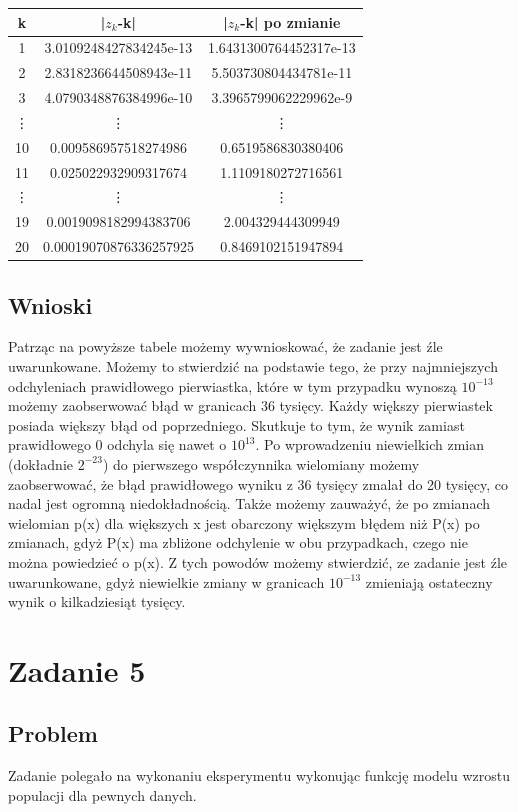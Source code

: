 \documentclass[11pt, a4paper]{article}
\begin{document}
\begin{center}
  \begin{tabular}{c|c|c}
    k & |$z_{k}$-k| & |$z_{k}$-k| po zmianie\\
    \hline
    1 & 3.0109248427834245e-13 & 1.6431300764452317e-13\\
    2 & 2.8318236644508943e-11 & 5.503730804434781e-11\\
    3 & 4.0790348876384996e-10 & 3.3965799062229962e-9\\
    \vdots \qquad & \vdots \qquad & \vdots \qquad \\
    10 & 0.009586957518274986 & 0.6519586830380406\\
    11 & 0.025022932909317674 & 1.1109180272716561\\
    \vdots \qquad & \vdots \qquad & \vdots \qquad \\
    19 & 0.0019098182994383706 & 2.004329444309949\\
    20 & 0.00019070876336257925 & 0.8469102151947894
  \end{tabular}
\end{center}
\subsection{Wnioski}
Patrząc na powyższe tabele możemy wywnioskować, że zadanie jest źle uwarunkowane. Możemy to stwierdzić na podstawie tego, że przy najmniejszych odchyleniach prawidłowego pierwiastka, które w tym przypadku wynoszą $10^{-13}$ możemy zaobserwować błąd w granicach 36 tysięcy. Każdy większy pierwiastek posiada większy błąd od poprzedniego. Skutkuje to tym, że wynik zamiast prawidłowego 0 odchyla się nawet o $10^{13}$. Po wprowadzeniu niewielkich zmian (dokładnie $2^{-23}$) do pierwszego współczynnika wielomiany możemy zaobserwować, że błąd prawidłowego wyniku z 36 tysięcy zmalał do 20 tysięcy, co nadal jest ogromną niedokładnością. Także możemy zauważyć, że po zmianach wielomian p(x) dla większych x jest obarczony większym błędem niż P(x) po zmianach, gdyż P(x) ma zbliżone odchylenie w obu przypadkach, czego nie można powiedzieć o p(x). Z tych powodów możemy stwierdzić, ze zadanie jest źle uwarunkowane, gdyż niewielkie zmiany w granicach $10^{-13}$ zmieniają ostateczny wynik o kilkadziesiąt tysięcy.



\section{Zadanie 5}
\subsection{Problem}
Zadanie polegało na wykonaniu eksperymentu wykonując funkcję modelu wzrostu populacji dla pewnych danych.
\end{document}
